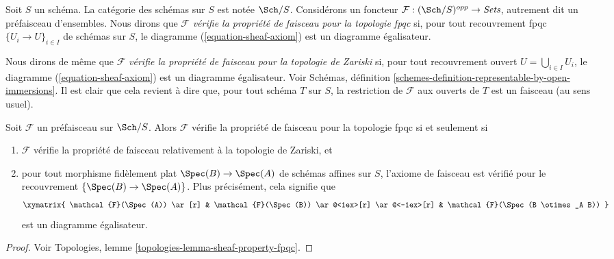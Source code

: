 \begin{definition}
\label{definition-sheaf-property-fpqc}
Soit $S$ un sch\'ema. La cat\'egorie des sch\'emas sur $S$ est not\'ee
$\Sch/S$. Consid\'erons un foncteur
$\mathcal{F} : (\Sch/S)^{opp} \to \textit{Sets}$, autrement dit
un pr\'efaisceau d'ensembles. Nous dirons que $\mathcal{F}$
{\it v\'erifie la propri\'et\'e de faisceau pour la topologie fpqc}
si, pour tout recouvrement fpqc $\{U_i \to U\}_{i \in I}$ de sch\'emas sur $S$,
le diagramme (\ref{equation-sheaf-axiom}) est un diagramme \'egalisateur.
\end{definition}

\noindent
Nous dirons de m\^eme que $\mathcal{F}$
{\it v\'erifie la propri\'et\'e de faisceau pour la topologie de Zariski} si, pour
tout recouvrement ouvert $U = \bigcup_{i \in I} U_i$, le diagramme
(\ref{equation-sheaf-axiom}) est un diagramme \'egalisateur. Voir
Sch\'emas, d\'efinition \ref{schemes-definition-representable-by-open-immersions}.
Il est clair que cela revient \`a dire que, pour tout sch\'ema $T$ sur $S$, la
restriction de $\mathcal{F}$ aux ouverts de $T$ est un faisceau (au sens usuel).

\begin{lemma}
\label{lemma-fpqc-sheaves}
Soit $\mathcal{F}$ un pr\'efaisceau sur $\Sch/S$. Alors
$\mathcal{F}$ v\'erifie la propri\'et\'e de faisceau pour la topologie fpqc
si et seulement si
\begin{enumerate}
\item $\mathcal{F}$ v\'erifie la propri\'et\'e de faisceau relativement \`a la
topologie de Zariski, et
\item pour tout morphisme fid\`element plat $\Spec(B) \to \Spec(A)$
de sch\'emas affines sur $S$, l'axiome de faisceau est v\'erifi\'e pour le recouvrement
$\{\Spec(B) \to \Spec(A)\}$. Plus pr\'ecis\'ement, cela signifie que
$$
\xymatrix{
\mathcal{F}(\Spec(A)) \ar[r] &
\mathcal{F}(\Spec(B)) \ar@<1ex>[r] \ar@<-1ex>[r] &
\mathcal{F}(\Spec(B \otimes_A B))
}
$$
est un diagramme \'egalisateur.
\end{enumerate}
\end{lemma}

\begin{proof}
Voir Topologies, lemme \ref{topologies-lemma-sheaf-property-fpqc}.
\end{proof}

